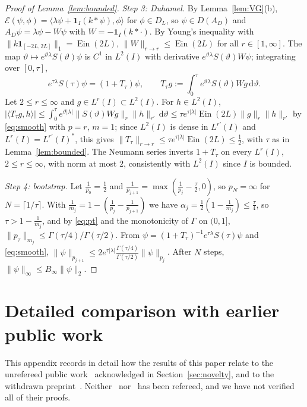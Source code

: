 \documentclass[11pt]{amsart}
\newcommand{\E}{\mathcal{E}}
\newcommand{\one}{\mathbf{1}}
\newcommand{\dd}{\,\mathrm{d}}
\DeclareMathOperator{\Ein}{Ein}
\theoremstyle{definition}
\theoremstyle{remark}
\numberwithin{equation}{section}
\begin{document}
\begin{proof}[Proof of Lemma~\ref{lem:bounded}]
\emph{Step 3: Duhamel.} By Lemma~\ref{lem:VG}(b), $\E(\psi,\phi)=\langle\lambda\psi+\one_I(k*\psi),\phi\rangle$ for $\phi\in D_L$, so $\psi\in D(A_D)$ and $A_D\psi=\lambda\psi-W\psi$ with $W=-\one_I(k*\cdot)$. By Young's inequality with $\|k\one_{[-2L,2L]}\|_1=\Ein(2L)$, $\|W\|_{r\to r}\le\Ein(2L)$ for all $r\in[1,\infty]$. The map $\vartheta\mapsto e^{\vartheta\lambda}S(\vartheta)\psi$ is $C^1$ in $L^2(I)$ with derivative $e^{\vartheta\lambda}S(\vartheta)W\psi$; integrating over $[0,\tau]$,
\[
e^{\tau\lambda}S(\tau)\psi=(1+T_\tau)\psi,\qquad T_\tau g:=\int_0^\tau e^{\vartheta\lambda}S(\vartheta)Wg\dd\vartheta .
\]
Let $2\le r\le\infty$ and $g\in L^r(I)\subset L^2(I)$. For $h\in L^2(I)$, $|\langle T_\tau g,h\rangle|\le\int_0^\tau e^{\vartheta|\lambda|}\|S(\vartheta)Wg\|_r\|h\|_{r'}\dd\vartheta\le\tau e^{\tau|\lambda|}\Ein(2L)\|g\|_r\|h\|_{r'}$ by \eqref{eq:smooth} with $p=r$, $m=1$; since $L^2(I)$ is dense in $L^{r'}(I)$ and $L^r(I)=L^{r'}(I)^*$, this gives $\|T_\tau\|_{r\to r}\le\tau e^{\tau|\lambda|}\Ein(2L)\le\frac12$, with $\tau$ as in Lemma~\ref{lem:bounded}. The Neumann series inverts $1+T_\tau$ on every $L^r(I)$, $2\le r\le\infty$, with norm at most $2$, consistently with $L^2(I)$ since $I$ is bounded.

\emph{Step 4: bootstrap.} Let $\frac1{p_0}=\frac12$ and $\frac1{p_{j+1}}=\max(\frac1{p_j}-\frac\tau2,0)$, so $p_N=\infty$ for $N=\lceil1/\tau\rceil$. With $\frac1{m_j}=1-(\frac1{p_j}-\frac1{p_{j+1}})$ we have $\alpha_j=\frac12(1-\frac1{m_j})\le\frac\tau4$, so $\tau>1-\frac1{m_j}$, and by \eqref{eq:pt} and the monotonicity of $\Gamma$ on $(0,1]$, $\|p_\tau\|_{m_j}\le\Gamma(\tau/4)/\Gamma(\tau/2)$. From $\psi=(1+T_\tau)^{-1}e^{\tau\lambda}S(\tau)\psi$ and \eqref{eq:smooth}, $\|\psi\|_{p_{j+1}}\le2e^{\tau|\lambda|}\frac{\Gamma(\tau/4)}{\Gamma(\tau/2)}\|\psi\|_{p_j}$. After $N$ steps, $\|\psi\|_\infty\le B_\infty\|\psi\|_2$.
\end{proof}

\section{Detailed comparison with earlier public work}\label{app:comparison}

This appendix records in detail how the results of this paper relate to the unrefereed public work~\cite{BT26,Mathia26} acknowledged in Section~\ref{sec:novelty}, and to the withdrawn preprint~\cite{AGV24}. Neither~\cite{BT26} nor~\cite{Mathia26} has been refereed, and we have not verified all of their proofs.
\end{document}
